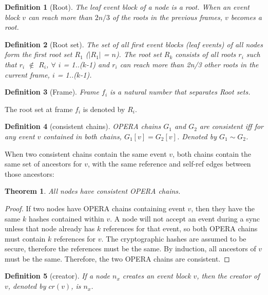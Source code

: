 \documentclass{article}
\newtheorem{thm}{Theorem}[section]
\newtheorem{defn}{Definition}[section]
\begin{document}
\begin{defn}[Root]
\label{def:root}
	The leaf event block of a node is a root.
	When an event block $v$ can reach more than $2n/3$ of the roots in the previous frames, $v$ becomes a root.
\end{defn}

\begin{defn}[Root set]
	The set of all first event blocks (leaf events) of all nodes form the first root set $R_1$ ($|R_1|$ = $n$). The root set $R_k$ consists of all roots $r_i$ such that $r_i$ $\not \in $ $R_i$, $\forall$ $i$ = 1..($k$-1) and $r_i$ can reach more than 2n/3 other roots in the current frame, $i$ = 1..($k$-1).  
\end{defn}

\begin{defn}[Frame]
Frame $f_i$ is a natural number that separates Root sets. 
\end{defn} 

The root set at frame $f_i$ is denoted by $R_i$.


\begin{defn}[consistent chains]\label{dfn:conchains} OPERA chains $G_1$ and $G_2$ are consistent iff for any event $v$ contained in both chains, $G_1[v] = G_2[v]$. Denoted by $G_1 \sim G_2$.
\end{defn}
When two consistent chains contain the same event $v$, both chains contain the same set of ancestors for $v$, with the same reference and self-ref edges between those ancestors:
\begin{thm}\label{thm:conchains}
	All nodes have consistent OPERA chains.
\end{thm}
\begin{proof}
	 If two nodes have OPERA chains containing event $v$, then they have the same $k$ hashes contained within $v$. A node will not accept an event during a sync unless that node already has $k$ references for that event, so both OPERA chains must contain $k$ references for $v$. The cryptographic hashes are assumed to be secure, therefore the references must be the same. By induction, all ancestors of $v$ must be the same. Therefore, the two OPERA chains are consistent.
\end{proof}


\begin{defn}[creator] If a node $n_x$ creates an event block $v$, then the creator of $v$, denoted by $cr(v)$, is $n_x$.
\end{defn}
\end{document}

